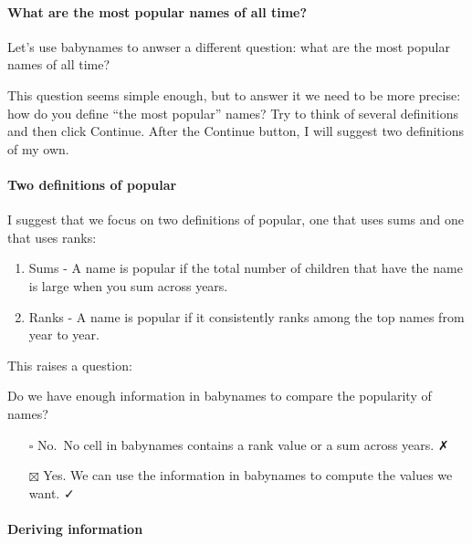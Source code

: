\documentclass[
]{article}
\providecommand{\tightlist}{%
  \setlength{\itemsep}{0pt}\setlength{\parskip}{0pt}}
\begin{document}
\hypertarget{what-are-the-most-popular-names-of-all-time}{%
\paragraph{What are the most popular names of all
time?}\label{what-are-the-most-popular-names-of-all-time}}

Let's use babynames to anwser a different question: what are the most
popular names of all time?

This question seems simple enough, but to answer it we need to be more
precise: how do you define ``the most popular'' names? Try to think of
several definitions and then click Continue. After the Continue button,
I will suggest two definitions of my own.

\hypertarget{two-definitions-of-popular}{%
\paragraph{Two definitions of
popular}\label{two-definitions-of-popular}}

I suggest that we focus on two definitions of popular, one that uses
sums and one that uses ranks:

\begin{enumerate}
\def\labelenumi{\arabic{enumi}.}
\tightlist
\item
  Sums - A name is popular if the total number of children that have the
  name is large when you sum across years.
\item
  Ranks - A name is popular if it consistently ranks among the top names
  from year to year.
\end{enumerate}

This raises a question:

Do we have enough information in babynames to compare the popularity of
names?

\begin{itemize}
\tightlist
\item[$\square$]
  No.~No cell in babynames contains a rank value or a sum across years.
  ✗
\item[$\boxtimes$]
  Yes. We can use the information in babynames to compute the values we
  want. ✓
\end{itemize}

\hypertarget{deriving-information}{%
\paragraph{Deriving information}\label{deriving-information}}
\end{document}
